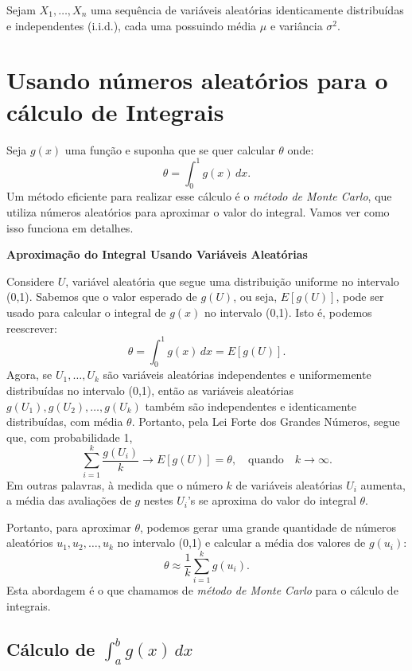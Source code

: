 \documentclass[
]{book}
\begin{document}
Sejam \(X_1,\ldots,X_n\) uma sequência de variáveis aleatórias identicamente distribuídas e independentes (i.i.d.), cada uma possuindo média \(\mu\) e variância \(\sigma^2\).

\chapter{Usando números aleatórios para o cálculo de Integrais}\label{usando-nuxfameros-aleatuxf3rios-para-o-cuxe1lculo-de-integrais}

Seja \(g(x)\) uma função e suponha que se quer calcular \(\theta\) onde:
\[\theta = \int_{0}^{1}g(x)\, dx.\] Um método eficiente para realizar
esse cálculo é o \emph{método de Monte Carlo}, que utiliza números aleatórios
para aproximar o valor do integral. Vamos ver como isso funciona em
detalhes.

\textbf{Aproximação do Integral Usando Variáveis Aleatórias}

Considere \(U\), variável aleatória que segue uma distribuição uniforme no
intervalo (0,1). Sabemos que o valor esperado de \(g(U)\), ou seja,
\(E[g(U)]\), pode ser usado para calcular o integral de \(g(x)\) no
intervalo (0,1). Isto é, podemos reescrever:
\[\theta = \int_{0}^{1}g(x)\,dx = E[g(U)].\] Agora, se \(U_1,\ldots,U_k\)
são variáveis aleatórias independentes e uniformemente distribuídas no
intervalo (0,1), então as variáveis aleatórias
\(g(U_1),g(U_2),\ldots,g(U_k)\) também são independentes e identicamente
distribuídas, com média \(\theta\). Portanto, pela Lei Forte dos Grandes
Números, segue que, com probabilidade 1,
\[\sum_{i=1}^{k}\frac{g(U_i)}{k} \longrightarrow E[g(U)]=\theta, \quad \text{quando} \quad k\rightarrow \infty.\]
Em outras palavras, à medida que o número \(k\) de variáveis aleatórias
\(U_i\) aumenta, a média das avaliações de \(g\) nestes \(U_i\)'s se aproxima
do valor do integral \(\theta\).

Portanto, para aproximar \(\theta\), podemos gerar uma grande quantidade
de números aleatórios \(u_1, u_2, \ldots, u_k\) no intervalo (0,1) e
calcular a média dos valores de \(g(u_i)\):
\[\theta \approx \frac{1}{k}\sum_{i=1}^{k}g(u_i).\] Esta abordagem é o
que chamamos de \emph{método de Monte Carlo} para o cálculo de integrais.

\section{\texorpdfstring{Cálculo de \(\int_{a}^{b}g(x)\, dx\)}{Cálculo de \textbackslash int\_\{a\}\^{}\{b\}g(x)\textbackslash, dx}}\label{cuxe1lculo-de-int_abgx-dx}
\end{document}

